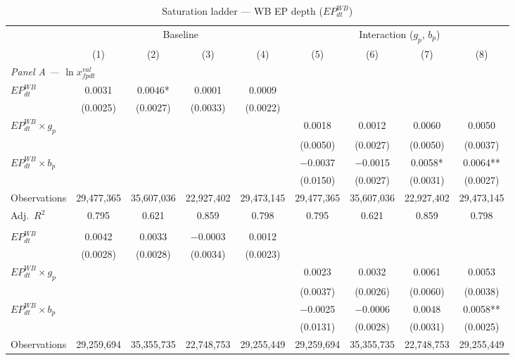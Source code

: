 \begin{table}[htbp]
\centering
\scriptsize
\setlength{\tabcolsep}{3pt}
\caption{Saturation ladder --- WB EP depth ($EP^{WB}_{dt}$)}
\label{tab:ladder_wb}
\begin{threeparttable}
\begin{tabular}{lcccccccc}
\toprule
 & \multicolumn{4}{c}{Baseline} & \multicolumn{4}{c}{Interaction ($g_p$, $b_p$)} \\
\cmidrule(lr){2-5}\cmidrule(lr){6-9}
 & (1) & (2) & (3) & (4) & (5) & (6) & (7) & (8) \\
\midrule
\multicolumn{9}{l}{\textit{Panel A --- $\ln x^{val}_{fpdt}$}} \\[3pt]
\quad $EP^{WB}_{dt}$ & 0.0031 & 0.0046* & 0.0001 & 0.0009 &  &  &  &  \\
 & (0.0025) & (0.0027) & (0.0033) & (0.0022) &  &  &  &  \\
\quad $EP^{WB}_{dt} \times g_p$ &  &  &  &  & 0.0018 & 0.0012 & 0.0060 & 0.0050 \\
 &  &  &  &  & (0.0050) & (0.0027) & (0.0050) & (0.0037) \\
\quad $EP^{WB}_{dt} \times b_p$ &  &  &  &  & $-$0.0037 & $-$0.0015 & 0.0058* & 0.0064** \\
 &  &  &  &  & (0.0150) & (0.0027) & (0.0031) & (0.0027) \\[3pt]
Observations & 29,477,365 & 35,607,036 & 22,927,402 & 29,473,145 & 29,477,365 & 35,607,036 & 22,927,402 & 29,473,145 \\
Adj.\ $R^2$ & 0.795 & 0.621 & 0.859 & 0.798 & 0.795 & 0.621 & 0.859 & 0.798 \\
\addlinespace[6pt]
\midrule
\multicolumn{9}{l}{\textit{Panel B --- $\ln x^{qua}_{fpdt}$}} \\[3pt]
\quad $EP^{WB}_{dt}$ & 0.0042 & 0.0033 & $-$0.0003 & 0.0012 &  &  &  &  \\
 & (0.0028) & (0.0028) & (0.0034) & (0.0023) &  &  &  &  \\
\quad $EP^{WB}_{dt} \times g_p$ &  &  &  &  & 0.0023 & 0.0032 & 0.0061 & 0.0053 \\
 &  &  &  &  & (0.0037) & (0.0026) & (0.0060) & (0.0038) \\
\quad $EP^{WB}_{dt} \times b_p$ &  &  &  &  & $-$0.0025 & $-$0.0006 & 0.0048 & 0.0058** \\
 &  &  &  &  & (0.0131) & (0.0028) & (0.0031) & (0.0025) \\[3pt]
Observations & 29,259,694 & 35,355,735 & 22,748,753 & 29,255,449 & 29,259,694 & 35,355,735 & 22,748,753 & 29,255,449 \\

\end{tabular}
\end{threeparttable}
\end{table}
